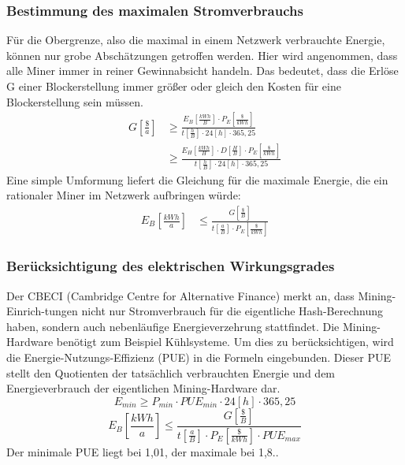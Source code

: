 \documentclass[12pt]{article}
\begin{document}
\subsubsection{Bestimmung des maximalen Stromverbrauchs}
Für die Obergrenze, also die maximal in einem Netzwerk verbrauchte Energie, können nur grobe Abschätzungen getroffen werden. Hier wird angenommen, dass alle Miner immer in reiner Gewinnabsicht handeln. Das bedeutet, dass die Erlöse G einer Blockerstellung immer größer oder gleich den Kosten für eine Blockerstellung sein müssen.
\begin{align*}
    G\left[\frac{\$}{a}\right]&\geq \frac{E_B\left[\frac{kWh}{B}\right]\cdot P_E\left[\frac{\$}{kWh}\right]}{t \left[\frac{h}{B}\right]\cdot 24[h]\cdot 365,25}\\
    &\geq \frac{E_H\left[\frac{kWh}{H}\right]\cdot D\left[\frac{H}{B}\right]\cdot P_E\left[\frac{\$}{kWh}\right]}{t \left[\frac{h}{B}\right]\cdot 24[h]\cdot 365,25}
\end{align*}
Eine simple Umformung liefert die Gleichung für die maximale Energie, die ein rationaler Miner im Netzwerk aufbringen würde:
\begin{align*}
    E_B\left[\frac{kWh}{a}\right]&\leq\frac{G\left[\frac{\$}{B}\right]}{t \left[\frac{a}{B}\right]\cdot P_E\left[\frac{\$}{kWh}\right]}
\end{align*}

\subsubsection{Berücksichtigung des elektrischen Wirkungsgrades}
Der CBECI (Cambridge Centre for Alternative Finance) merkt an, dass Mining-Einrich-tungen nicht nur Stromverbrauch für die eigentliche Hash-Berechnung haben, sondern auch nebenläufige Energieverzehrung stattfindet. Die Mining-Hardware benötigt zum Beispiel Kühlsysteme. Um dies zu berücksichtigen, wird die Energie-Nutzungs-Effizienz (PUE) in die Formeln eingebunden. Dieser PUE stellt den Quotienten der tatsächlich verbrauchten Energie und dem Energieverbrauch der eigentlichen Mining-Hardware dar.
\[E_{min}\geq P_{min}\cdot PUE_{min}\cdot 24[h]\cdot 365,25\]
\[E_B\left[\frac{kWh}{a}\right]\leq\frac{G\left[\frac{\$}{B}\right]}{t \left[\frac{a}{B}\right]\cdot P_E\left[\frac{\$}{kWh}\right]\cdot PUE_{max}}\]
Der minimale PUE liegt bei 1,01, der maximale bei 1,8..
\end{document}
